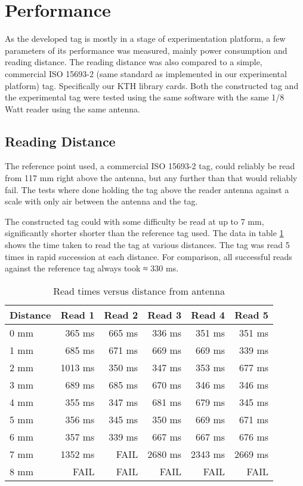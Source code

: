 \section{Performance}

As the developed tag is mostly in a stage of experimentation platform, a few parameters of its performance
was measured, mainly power consumption and reading distance. The reading distance was also compared to a
simple, commercial ISO 15693-2 (same standard as implemented in our experimental platform) tag. Specifically our
KTH library cards. Both the constructed tag and the experimental tag were tested using the same software with
the same 1/8 Watt reader using the same antenna.

\subsection{Reading Distance}
The reference point used, a commercial ISO 15693-2 tag, could reliably be read from 117 mm right above the
antenna, but any further than that would reliably fail. The tests where done holding the tag above the reader
antenna against a scale with only air between the antenna and the tag.

The constructed tag could with some difficulty be read at up to 7 mm, significantly shorter shorter than
the reference tag used. The data in table \ref{tab:readdistance} shows the time taken to read the tag at various distances.
The tag was read 5 times in rapid succession at each distance. For comparison, all successful reads against
the reference tag always took ≈ 330 ms.

\begin{table}
\centering
\begin{tabular}{| l | r | r | r | r | r |}
	\hline
	Distance & Read 1 & Read 2 & Read 3 & Read 4 & Read 5 \\ \hline
	0 mm & 365 ms & 665 ms & 336 ms & 351 ms & 351 ms \\ \hline
	1 mm & 685 ms & 671 ms & 669 ms & 669 ms & 339 ms \\ \hline
	2 mm & 1013 ms & 350 ms & 347 ms & 353 ms & 677 ms \\ \hline
	3 mm & 689 ms & 685 ms & 670 ms & 346 ms & 346 ms \\ \hline
	4 mm & 355 ms & 347 ms & 681 ms & 679 ms & 345 ms \\ \hline
	5 mm & 356 ms & 345 ms & 350 ms & 669 ms & 671 ms \\ \hline
	6 mm & 357 ms & 339 ms & 667 ms & 667 ms & 676 ms \\ \hline
	7 mm & 1352 ms & FAIL & 2680 ms & 2343 ms & 2669 ms \\ \hline
	8 mm & FAIL & FAIL & FAIL & FAIL & FAIL \\ \hline
\end{tabular}
\caption{Read times versus distance from antenna}
\label{tab:readdistance}
\end{table}

